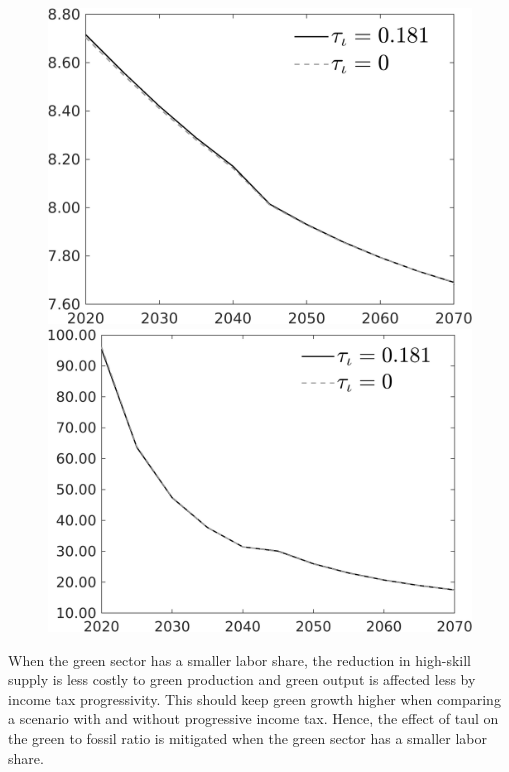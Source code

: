 \documentclass[12pt]{article}
\begin{document}
\begin{figure}[h!!]
\begin{minipage}[]{0.32\textwidth}
	\end{minipage}	
	\begin{minipage}[]{0.32\textwidth}
		\includegraphics[width=1\textwidth]{../../codding_model/own_basedOnFried/optimalPol_010922_revision/figures/all_13Sept22/CompTauf_bytaul_Equlab_Reg0_gAn_spillover0_nsk0_xgr0_knspil0_sep1_LFlimit1_emsbase0_countec0_GovRev0_etaa0.79_lgd1.png}
	\end{minipage}	
	\begin{minipage}[]{0.32\textwidth}
		\includegraphics[width=1\textwidth]{../../codding_model/own_basedOnFried/optimalPol_010922_revision/figures/all_13Sept22/CompTauf_bytaul_Equlab_Reg0_gAg_spillover0_nsk0_xgr0_knspil0_sep1_LFlimit1_emsbase0_countec0_GovRev0_etaa0.79_lgd1.png}
	\end{minipage}	
\end{figure}
When the green sector has a smaller labor share, the reduction in high-skill supply is less costly to green production and green output is affected less by income tax progressivity. This should keep green growth higher when comparing a scenario with and without progressive income tax. Hence, the effect of taul on the green to fossil ratio is mitigated when the green sector has a smaller labor share. 
\end{document}

